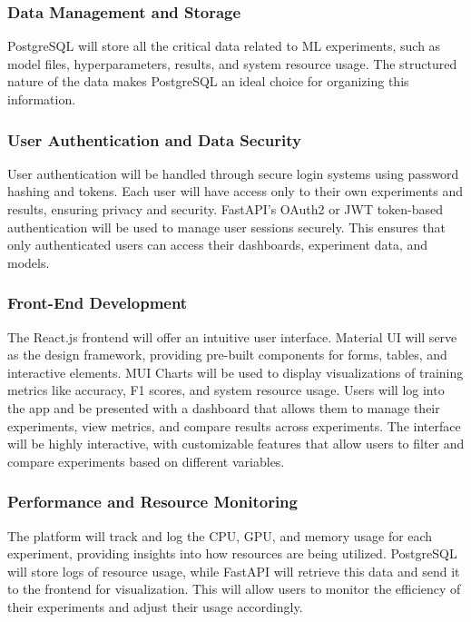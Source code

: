 \documentclass[12pt]{article}
\begin{document}
\subsubsection{Data Management and Storage}

PostgreSQL will store all the critical data related to ML experiments, such as model files, hyperparameters, results, and system resource usage. The structured nature of the data makes PostgreSQL an ideal choice for organizing this information.

\subsubsection{User Authentication and Data Security}

User authentication will be handled through secure login systems using password hashing and tokens. Each user will have access only to their own experiments and results, ensuring privacy and security. FastAPI’s OAuth2 or JWT token-based authentication will be used to manage user sessions securely. This ensures that only authenticated users can access their dashboards, experiment data, and models.

\subsubsection{Front-End Development}

The React.js frontend will offer an intuitive user interface. Material UI will serve as the design framework, providing pre-built components for forms, tables, and interactive elements. MUI Charts will be used to display visualizations of training metrics like accuracy, F1 scores, and system resource usage. Users will log into the app and be presented with a dashboard that allows them to manage their experiments, view metrics, and compare results across experiments. The interface will be highly interactive, with customizable features that allow users to filter and compare experiments based on different variables.

\subsubsection{Performance and Resource Monitoring}

The platform will track and log the CPU, GPU, and memory usage for each experiment, providing insights into how resources are being utilized. PostgreSQL will store logs of resource usage, while FastAPI will retrieve this data and send it to the frontend for visualization. This will allow users to monitor the efficiency of their experiments and adjust their usage accordingly.
\end{document}
